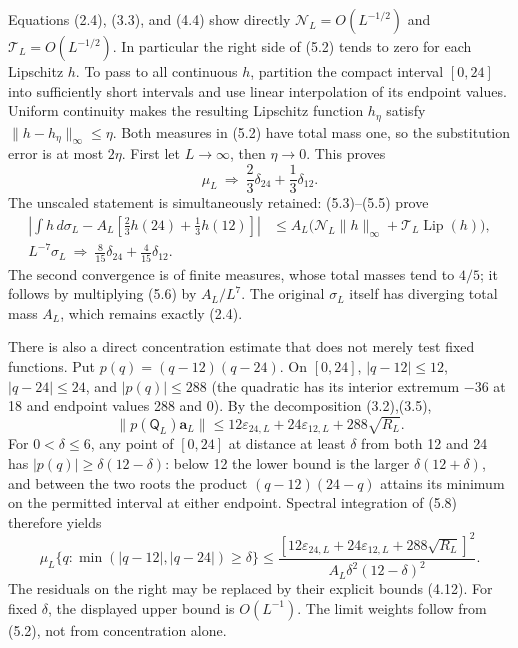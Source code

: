 \documentclass[
  11pt,
]{article}
\begin{document}
Equations (2.4), (3.3), and (4.4) show directly
\(\mathcal N_L=O(L^{-1/2})\) and \(\mathcal T_L=O(L^{-1/2})\). In
particular the right side of (5.2) tends to zero for each Lipschitz
\(h\). To pass to all continuous \(h\), partition the compact interval
\([0,24]\) into sufficiently short intervals and use linear
interpolation of its endpoint values. Uniform continuity makes the
resulting Lipschitz function \(h_\eta\) satisfy
\(\|h-h_\eta\|_\infty\le\eta\). Both measures in (5.2) have total mass
one, so the substitution error is at most \(2\eta\). First let
\(L\to\infty\), then \(\eta\to0\). This proves \[
\boxed{\mu_L\ \Longrightarrow\ \frac23\delta_{24}+\frac13\delta_{12}.}
\tag{5.6}
\] The unscaled statement is simultaneously retained: (5.3)--(5.5) prove
\[
\begin{split}
\left|\int h\,d\sigma_L
       -A_L\left[\frac23h(24)+\frac13h(12)\right]\right|
 &\le A_L\bigl(\mathcal N_L\|h\|_\infty
                +\mathcal T_L\operatorname{Lip}(h)\bigr),\\
\boxed{L^{-7}\sigma_L\ \Longrightarrow\
              \frac8{15}\delta_{24}+\frac4{15}\delta_{12}.}
\end{split}
\tag{5.7}
\] The second convergence is of finite measures, whose total masses tend
to \(4/5\); it follows by multiplying (5.6) by \(A_L/L^7\). The original
\(\sigma_L\) itself has diverging total mass \(A_L\), which remains
exactly (2.4).

There is also a direct concentration estimate that does not merely test
fixed functions. Put \(p(q)=(q-12)(q-24)\). On \([0,24]\),
\(|q-12|\le12\), \(|q-24|\le24\), and \(|p(q)|\le288\) (the quadratic
has its interior extremum \(-36\) at 18 and endpoint values 288 and 0).
By the decomposition (3.2),(3.5), \[
\|p(\mathsf Q_L)\boldsymbol a_L\|
 \le12\varepsilon_{24,L}+24\varepsilon_{12,L}+288\sqrt{R_L}.
\tag{5.8}
\] For \(0<\delta\le6\), any point of \([0,24]\) at distance at least
\(\delta\) from both 12 and 24 has \(|p(q)|\ge\delta(12-\delta)\): below
12 the lower bound is the larger \(\delta(12+\delta)\), and between the
two roots the product \((q-12)(24-q)\) attains its minimum on the
permitted interval at either endpoint. Spectral integration of (5.8)
therefore yields \[
\boxed{
\mu_L\{q:\min(|q-12|,|q-24|)\ge\delta\}
 \le\frac{[12\varepsilon_{24,L}+24\varepsilon_{12,L}
                    +288\sqrt{R_L}]^2}
             {A_L\delta^2(12-\delta)^2}.}
\tag{5.9}
\] The residuals on the right may be replaced by their explicit bounds
(4.12). For fixed \(\delta\), the displayed upper bound is
\(O(L^{-1})\). The limit weights follow from (5.2), not from
concentration alone.
\end{document}
